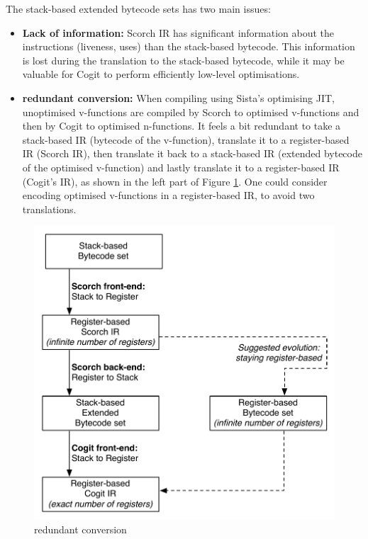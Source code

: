 \documentclass[a4paper,12pt,twoside]{../includes/ThesisStyle}
\begin{document}
The stack-based extended bytecode sets has two main issues:
\begin{itemize}
	\item \textbf{Lack of information:} Scorch IR has significant information about the instructions (liveness, uses) than the stack-based bytecode. This information is lost during the translation to the stack-based bytecode, while it may be valuable for Cogit to perform efficiently low-level optimisations.
	\item \textbf{redundant conversion:} When compiling using Sista's optimising JIT, unoptimised v-functions are compiled by Scorch to optimised v-functions and then by Cogit to optimised n-functions. It feels a bit redundant to take a stack-based IR (bytecode of the v-function), translate it to a register-based IR (Scorch IR), then translate it back to a stack-based IR (extended bytecode of the optimised v-function) and lastly translate it to a register-based IR (Cogit's IR), as shown in the left part of Figure \ref{fig:FutureWorkredundant}. One could consider encoding optimised v-functions in a register-based IR, to avoid two translations.
\end{itemize}

\begin{figure}[h!]
    \begin{center}
        \includegraphics[width=0.7\linewidth]{FutureWorkredondant}
        \caption{redundant conversion}
        \label{fig:FutureWorkredundant}
    \end{center}
\end{figure}
\end{document}

